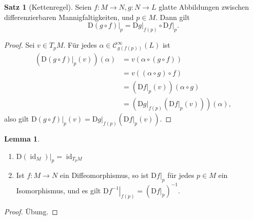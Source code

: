 \documentclass[a4paper]{scrreprt}
\numberwithin{equation}{chapter}
\newcommand{\DD}{\mathrm{D}}
\DeclareMathOperator{\id}{id}
\newcommand{\sC}{\mathcal{C}^{\infty}}
\theoremstyle{definition}
\newtheorem{lemma}[defn]{Lemma}
\newtheorem{satz}[defn]{Satz}
\newcommand{\bewUeb}{\begin{proof}Übung.\end{proof}}
\begin{document}
\begin{satz}[Kettenregel]
	Seien $f\colon M \to N, g\colon N \to L$ glatte Abbildungen zwischen differenzierbaren Mannigfaltigkeiten, und $p \in M$. Dann gilt \[\left.\DD(g\circ f)\right|_p = \left.\DD g\right|_{f(p)} \circ \left.\DD f\right|_p.\]

	\begin{proof}
		Sei $v \in T_pM$. Für jedes $\alpha \in \sC_{g(f(p))}(L)$ ist
		\begin{align*}
			\left(\left.\DD(g\circ f)\right|_p(v)\right)(\alpha) &= v(\alpha\circ (g \circ f))\\
			&= v((\alpha\circ g) \circ f)\\
			&= \left(\left.\DD f\right|_p(v)\right) (\alpha \circ g)\\
			&= \left(\left.\DD g\right|_{f(p)} \left(\left.\DD f\right|_p(v)\right)\right) (\alpha),
		\end{align*}
		also gilt $\left.\DD(g\circ f)\right|_p(v) = \left.\DD g\right|_{f(p)}\left(\left.\DD f\right|_p(v)\right)$.
	\end{proof}
\end{satz}

\begin{lemma} \label{lemma:differential_diffeo}
	\begin{enumerate}[label=(\alph*)]
		\item $\left.\DD(\id_M)\right|_p = \id_{T_pM}$
		\item Ist $f\colon M \to N$ ein Diffeomorphismus, so ist $\left.\DD f\right|_p$ für jedes $p\in M$ ein Isomorphismus, und es gilt $\left.\DD f^{-1}\right|_{f(p)} = \left(\left.\DD f\right|_p\right)^{-1}$.
	\end{enumerate}
	\bewUeb
\end{lemma}
\end{document}

